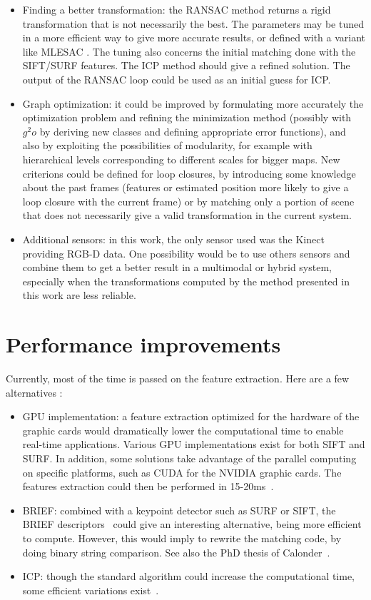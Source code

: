 \begin{itemize}
\item Finding a better transformation: the \gls{RANSAC} method returns a rigid transformation that is not necessarily the best. The parameters may be tuned in a more efficient way to give more accurate results, or defined with a variant like MLESAC \cite{TorrZ00}. The tuning also concerns the initial matching done with the \gls{SIFT}/\gls{SURF} features. The \gls{ICP} \cite{zhang_92_icp} method should give a refined solution. The output of the \gls{RANSAC} loop could be used as an initial guess for \gls{ICP}. 
\item Graph optimization: it could be improved by formulating more accurately the optimization problem and refining the minimization method (possibly with~$g^2o$ by deriving new classes and defining appropriate error functions), and also by exploiting the possibilities of modularity, for example with hierarchical levels corresponding to different scales for bigger maps. New criterions could be defined for loop closures, by introducing some knowledge about the past frames (features or estimated position more likely to give a loop closure with the current frame) or by matching only a portion of scene that does not necessarily give a valid transformation in the current system.
\item Additional sensors: in this work, the only sensor used was the Kinect providing RGB-D data. One possibility would be to use others sensors and combine them to get a better result in a multimodal or hybrid system, especially when the transformations computed by the method presented in this work are less reliable.
\end{itemize}

\section{Performance improvements}

Currently, most of the time is passed on the feature extraction. Here are a few alternatives :
\begin{itemize}
\item GPU implementation: a feature extraction optimized for the hardware of the graphic cards would dramatically lower the computational time to enable real-time applications. Various GPU implementations exist for both SIFT and SURF. In addition, some solutions take advantage of the parallel computing on specific platforms, such as CUDA\texttrademark{} for the NVIDIA graphic cards. The features extraction could then be performed in 15-20ms~\cite{bjorkman}.
\item BRIEF: combined with a keypoint detector such as \gls{SURF} or \gls{SIFT}, the \gls{BRIEF} descriptors~\cite{Calonder10-brief} could give an interesting alternative, being more efficient to compute. However, this would imply to rewrite the matching code, by doing binary string comparison. See also the PhD thesis of Calonder~\cite{Calonder10_PhD}.
\item ICP: though the standard algorithm could increase the computational time, some efficient variations exist~\cite{Rusinkiewicz_2001}. 
\end{itemize}

